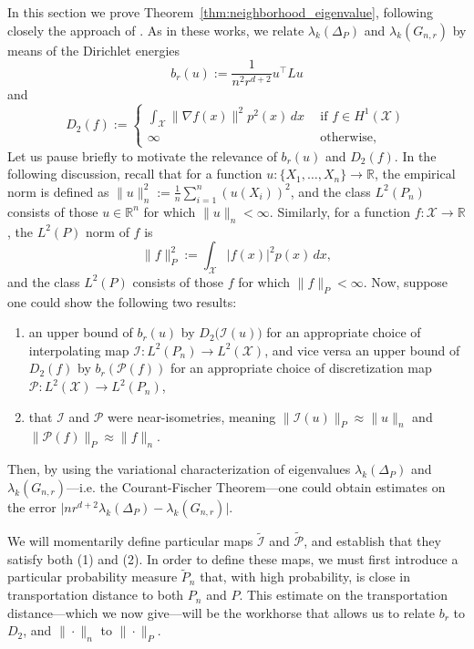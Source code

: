 \documentclass[twoside]{article}
\newcommand{\Reals}{\mathbb{R}}
\newcommand{\1}{\mathbf{1}}
\newcommand{\Xset}{\mathcal{X}}
\newcommand{\Leb}{L}
\newcommand{\mc}[1]{\mathcal{#1}}
\newcommand{\wt}[1]{\widetilde{#1}}
\theoremstyle{definition}
\theoremstyle{remark}
\begin{document}
In this section we prove Theorem~\ref{thm:neighborhood_eigenvalue}, following closely the approach of \citet{burago2014,trillos2019,calder2019}. As in these works, we relate $\lambda_k(\Delta_P)$ and $\lambda_k(G_{n,r})$ by means of the Dirichlet energies
\begin{equation*}
b_r(u) := \frac{1}{n^2 r^{d+ 2}}u^{\top} L u 
\end{equation*}
and
\begin{equation*}
D_2(f) :=
\begin{cases*}
\int_{\Xset} \|\nabla f(x)\|^2 p^2(x) \,dx~~ &\textrm{if $f \in H^1(\Xset)$} \\
\infty~~ & \textrm{otherwise,}
\end{cases*}
\end{equation*}
Let us pause briefly to motivate the relevance of $b_r(u)$ and $D_2(f)$. In the following discussion, recall that for a function $u: \{X_1,\ldots,X_n\} \to \Reals$, the empirical norm is defined as $\|u\|_n^2 := \frac{1}{n} \sum_{i = 1}^{n} (u(X_i))^2$, and the class $\Leb^2(P_n)$ consists of those $u \in \Reals^n$ for which $\|u\|_{n} < \infty$. Similarly, for a function $f: \Xset \to \Reals$, the $L^2(P)$ norm of $f$ is
\begin{equation*}
\|f\|_{P}^2 := \int_{\Xset} \bigl|f(x)\bigr|^2 p(x) \,dx,
\end{equation*} 
and the class $\Leb^2(P)$ consists of those $f$ for which $\|f\|_P < \infty$. Now, suppose one could show the following two results: 
\begin{enumerate}[(1)]
	\item an upper bound of $b_r(u)$ by $D_2\bigl(\mc{I}(u)\bigr)$ for an appropriate choice of interpolating map $\mc{I}: \Leb^2(P_n) \to \Leb^2(\mc{X})$, and vice versa an upper bound of $D_2(f)$ by $b_r(\mc{P}(f))$ for an appropriate choice of discretization map $\mc{P}: \Leb^2(\mc{X}) \to \Leb^2(P_n)$,
	\item that $\mc{I}$ and $\mc{P}$ were near-isometries, meaning $\|\mc{I}(u)\|_{P} \approx \|u\|_{n}$ and $\|\mc{P}(f)\|_{P} \approx \|f\|_{n}$.
\end{enumerate}
Then, by using the variational characterization of eigenvalues $\lambda_k(\Delta_P)$ and $\lambda_k(G_{n,r})$---i.e. the Courant-Fischer Theorem---one could obtain estimates on the error $\bigl|nr^{d + 2}\lambda_k(\Delta_P) - \lambda_k(G_{n,r})\bigr|$.

We will momentarily define particular maps $\wt{\mc{I}}$ and $\wt{\mc{P}}$, and establish that they satisfy both (1) and (2). In order to define these maps, we must first introduce a particular probability measure $\wt{P}_n$ that, with high probability, is close in transportation distance to both $P_n$ and $P$. This estimate on the transportation distance---which we now give---will be the workhorse that allows us to relate $b_r$ to $D_2$, and $\|\cdot\|_n$ to $\|\cdot\|_P$.
\end{document}
